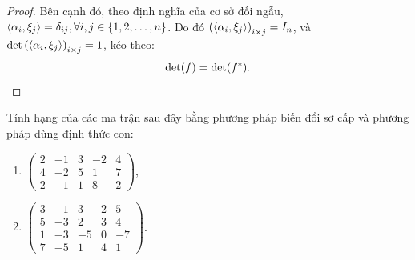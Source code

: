 \begin{proof}
    Bên cạnh đó, theo định nghĩa của cơ sở đối ngẫu, $\left\langle{\alpha_{i}, \xi_{j}}\right\rangle = \delta_{ij}, \forall i, j\in \{ 1, 2, \ldots, n \}$. Do đó ${(\left\langle{\alpha_{i}, \xi_{j}}\right\rangle)}_{i\times j} = I_{n}$, và $\det{(\left\langle{\alpha_{i}, \xi_{j}}\right\rangle)}_{i\times j} = 1$, kéo theo:
    \[
        \det(f) = \det(f^{*}).\qedhere
    \]
    \endgroup{}
\end{proof}

\begin{exercise}
    Tính hạng của các ma trận sau đây bằng phương pháp biến đổi sơ cấp và phương pháp dùng định thức con:
    \begin{enumerate}[label = (\alph*)]
        \item $
                  \begin{pmatrix}
                      2 & -1 & 3 & -2 & 4 \\
                      4 & -2 & 5 & 1  & 7 \\
                      2 & -1 & 1 & 8  & 2
                  \end{pmatrix}
              $,
        \item $
                  \begin{pmatrix}
                      3 & -1 & 3  & 2 & 5  \\
                      5 & -3 & 2  & 3 & 4  \\
                      1 & -3 & -5 & 0 & -7 \\
                      7 & -5 & 1  & 4 & 1
                  \end{pmatrix}
              $.
    \end{enumerate}
\end{exercise}


